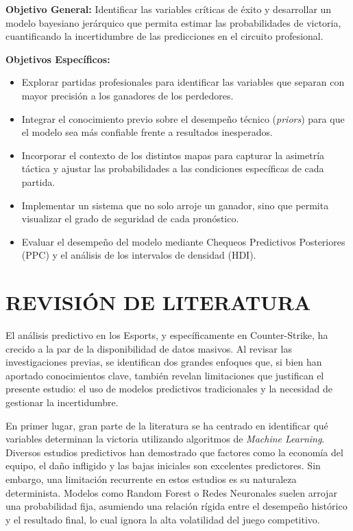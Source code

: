 \documentclass[twocolumn,10pt]{article}
\begin{document}
\textbf{Objetivo General:} Identificar las variables críticas de éxito y desarrollar un modelo bayesiano jerárquico que permita estimar las probabilidades de victoria, cuantificando la incertidumbre de las predicciones en el circuito profesional.

\textbf{Objetivos Específicos:}
\begin{itemize}
    \item Explorar partidas profesionales para identificar las variables que separan con mayor precisión a los ganadores de los perdedores.
    \item Integrar el conocimiento previo sobre el desempeño técnico (\textit{priors}) para que el modelo sea más confiable frente a resultados inesperados.
    \item Incorporar el contexto de los distintos mapas para capturar la asimetría táctica y ajustar las probabilidades a las condiciones específicas de cada partida.
    \item Implementar un sistema que no solo arroje un ganador, sino que permita visualizar el grado de seguridad de cada pronóstico.
    \item Evaluar el desempeño del modelo mediante Chequeos Predictivos Posteriores (PPC) y el análisis de los intervalos de densidad (HDI).
\end{itemize}

\section{REVISIÓN DE LITERATURA}

El análisis predictivo en los Esports, y específicamente en Counter-Strike, ha crecido a la par de la disponibilidad de datos masivos. Al revisar las investigaciones previas, se identifican dos grandes enfoques que, si bien han aportado conocimientos clave, también revelan limitaciones que justifican el presente estudio: el uso de modelos predictivos tradicionales y la necesidad de gestionar la incertidumbre.

En primer lugar, gran parte de la literatura se ha centrado en identificar qué variables determinan la victoria utilizando algoritmos de \textit{Machine Learning}. Diversos estudios predictivos \cite{csgodataset2020, makarov2017predicting, peng2024application} han demostrado que factores como la economía del equipo, el daño infligido y las bajas iniciales son excelentes predictores. Sin embargo, una limitación recurrente en estos estudios es su naturaleza determinista. Modelos como Random Forest o Redes Neuronales suelen arrojar una probabilidad fija, asumiendo una relación rígida entre el desempeño histórico y el resultado final, lo cual ignora la alta volatilidad del juego competitivo.
\end{document}
